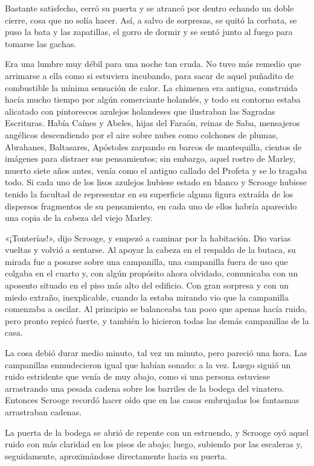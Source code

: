 \documentclass{novela}
\begin{document}
 Bastante satisfecho, cerró su puerta y se atrancó por dentro echando un doble cierre, cosa que no solía hacer. Así, a salvo de sorpresas, se quitó la corbata, se puso la bata y las zapatillas, el gorro de dormir y se sentó junto al fuego para tomarse las gachas.

 Era una lumbre muy débil para una noche tan cruda. No tuvo más remedio que arrimarse a ella como si estuviera incubando, para sacar de aquel puñadito de combustible la mínima sensación de calor. La chimenea era antigua, construida hacía mucho tiempo por algún comerciante holandés, y todo su contorno estaba alicatado con pintorescos azulejos holandeses que ilustraban las Sagradas Escrituras. Había Caínes y Abeles, hijas del Faraón, reinas de Saba, mensajeros angélicos descendiendo por el aire sobre nubes como colchones de plumas, Abrahanes, Baltasares, Apóstoles zarpando en barcos de mantequilla, cientos de imágenes para distraer sus pensamientos; sin embargo, aquel rostro de Marley, muerto siete años antes, venía como el antiguo callado del Profeta y se lo tragaba todo. Si cada uno de los lisos azulejos hubiese estado en blanco y Scrooge hubiese tenido la facultad de representar en su superficie alguna figura extraída de los dispersos fragmentos de su pensamiento, en cada uno de ellos habría aparecido una copia de la cabeza del viejo Marley.

 «¡Tonterías!», dijo Scrooge, y empezó a caminar por la habitación. Dio varias vueltas y volvió a sentarse. Al apoyar la cabeza en el respaldo de la butaca, su mirada fue a posarse sobre una campanilla, una campanilla fuera de uso que colgaba en el cuarto y, con algún propósito ahora olvidado, comunicaba con un aposento situado en el piso más alto del edificio. Con gran sorpresa y con un miedo extraño, inexplicable, cuando la estaba mirando vio que la campanilla comenzaba a oscilar. Al principio se balanceaba tan poco que apenas hacía ruido, pero pronto repicó fuerte, y también lo hicieron todas las demás campanillas de la casa.

 La cosa debió durar medio minuto, tal vez un minuto, pero pareció una hora. Las campanillas enmudecieron igual que habían sonado: a la vez. Luego siguió un ruido estridente que venía de muy abajo, como si una persona estuviese arrastrando una pesada cadena sobre los barriles de la bodega del vinatero. Entonces Scrooge recordó hacer oído que en las casas embrujadas los fantasmas arrastraban cadenas.

 La puerta de la bodega se abrió de repente con un estruendo, y Scrooge oyó aquel ruido con más claridad en los pisos de abajo; luego, subiendo por las escaleras y, seguidamente, aproximándose directamente hacia su puerta.
\end{document}
